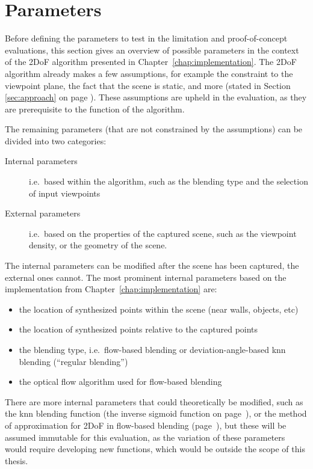 \section{Parameters} \label{sec:params}
Before defining the parameters to test in the limitation and proof-of-concept evaluations, this section gives an overview of possible parameters in the context of the 2DoF algorithm presented in Chapter~\ref{chap:implementation}.
The 2DoF algorithm already makes a few assumptions, for example the constraint to the viewpoint plane, the fact that the scene is static, and more (stated in Section \ref{sec:approach} on page \pageref{sec:approach}). These assumptions are upheld in the evaluation, as they are prerequisite to the function of the algorithm.

The remaining parameters (that are not constrained by the assumptions) can be divided into two categories: 
\begin{description}
    \item [Internal parameters] i.e.\ based within the algorithm, such as the blending type and the selection of input viewpoints
    \item [External parameters] i.e.\ based on the properties of the captured scene, such as the viewpoint density, or the geometry of the scene.
\end{description}      

The internal parameters can be modified after the scene has been captured, the external ones cannot.  The most prominent internal parameters based on the implementation from Chapter~\ref{chap:implementation} are:

\begin{itemize}
  \item the location of synthesized points within the scene (near walls, objects, etc)
  \item the location of synthesized points relative to the captured points
  \item the blending type, i.e.\ flow-based blending or deviation-angle-based knn blending (``regular blending'')
  \item the optical flow algorithm used for flow-based blending
\end{itemize}

There are more internal parameters that could theoretically be modified, such as the knn blending function (the inverse sigmoid function on page~\pageref{eq:sigmoid}), or the method of approximation for 2DoF in flow-based blending (page~\pageref{subsec:2dof_flow-based}), but these will be assumed immutable for this evaluation, as the variation of these parameters would require developing new functions, which would be outside the scope of this thesis.

